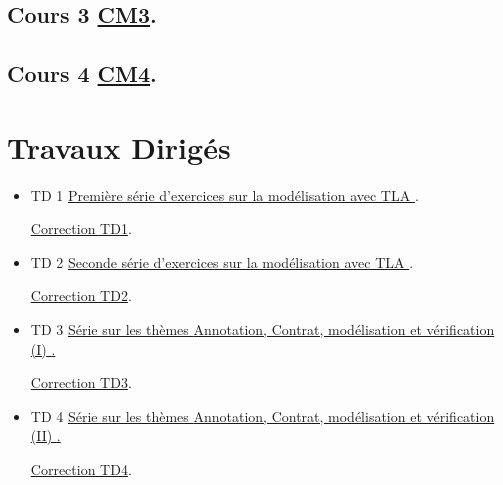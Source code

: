 \documentclass[ 12pt]{article}
\begin{document}
\subsection{Cours 3
  \href{http://mery54.github.io/teaching/mvsi/lecturesnotes/lectures-app-2024-cm3.pdf}{CM3}. }



\subsection{Cours 4
  \href{http://mery54.github.io/teaching/mvsi/lecturesnotes/lectures-app-2024-cm4.pdf}{CM4}. }

  

\section{Travaux Dirigés}

  \begin{itemize}
  \item[]   TD 1 
    \href{http://mery54.github.io/teaching/mvsi/lecturesnotes/td1.pdf}{Première 
      série d'exercices sur la modélisation avec TLA }.

       \href{http://mery54.github.io/teaching/mvsi/lecturesnotes/ctd1.pdf}{Correction 
       TD1}.

       
  \item[]   TD 2 
    \href{http://mery54.github.io/teaching/mvsi/lecturesnotes/td2.pdf}{Seconde
      série d'exercices sur la modélisation avec TLA }.    

          \href{http://mery54.github.io/teaching/mvsi/lecturesnotes/ctd2.pdf}{Correction 
            TD2}.
          
  \item[]   TD 3 
    \href{http://mery54.github.io/teaching/mvsi/lecturesnotes/td3.pdf}{
      Série sur les thèmes 
{Annotation, Contrat, mod\'elisation et  v\'erification (I) }.}

      \href{http://mery54.github.io/teaching/mvsi/lecturesnotes/ctd3.pdf}{Correction 
       TD3}.

\item[]   TD 4
    \href{http://mery54.github.io/teaching/mvsi/lecturesnotes/td4.pdf}{
      Série sur les thèmes 
{Annotation, Contrat, mod\'elisation et  v\'erification (II) }.}

      \href{http://mery54.github.io/teaching/mvsi/lecturesnotes/ctd4.pdf}{Correction 
       TD4}.
    
  \end{itemize}
\end{document}
